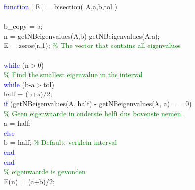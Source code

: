 \hspace{1mm}\textcolor{blue}{function} [ E ] = bisection( A,a,b,tol ) \\ 
\hspace{1mm} \\ 
\hspace{1mm}b\_copy = b; \\ 
\hspace{1mm}n = getNBeigenvalues(A,b)-getNBeigenvalues(A,a); \\ 
\hspace{1mm}E = zeros(n,1); \textcolor{green}{\% The vector that contains all eigenvalues }\\ 
\hspace{1mm} \\ 
\hspace{1mm}\textcolor{blue}{while} (n$>$0) \\ 
\hspace{1mm}\indent \textcolor{green}{\% Find the smallest eigenvalue in the interval }\\ 
\hspace{1mm}\indent \textcolor{blue}{while} (b-a$>$tol) \\ 
\hspace{1mm}\indent \indent half = (b+a)/2; \\ 
\hspace{1mm}\indent \indent \textcolor{blue}{if} (getNBeigenvalues(A, half) - getNBeigenvalues(A, a) == 0)  \\ 
\hspace{1mm}\indent \indent \indent \textcolor{green}{\% Geen eigenwaarde in onderste helft dus bovenste nemen. }\\ 
\hspace{1mm}\indent \indent \indent a = half; \\ 
\hspace{1mm}\indent \indent \textcolor{blue}{else} \\ 
\hspace{1mm}\indent \indent \indent b = half;    \textcolor{green}{\% Default: verklein interval  }\\ 
\hspace{1mm}\indent \indent \textcolor{blue}{end} \\ 
\hspace{1mm}\indent \textcolor{blue}{end} \\ 
\hspace{1mm}\indent \textcolor{green}{\% eigenwaarde is gevonden }\\ 
\hspace{1mm}\indent E(n) = (a+b)/2; \\ 
